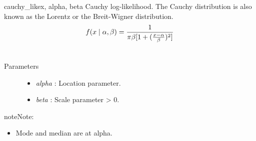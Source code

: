 \hypertarget{pymc.distributions.cauchy_like}{}\begin{funcdesc}{cauchy\_like}{x, alpha, beta}
Cauchy log-likelihood. The Cauchy distribution is also known as the
Lorentz or the Breit-Wigner distribution.
\begin{gather}
\begin{split}f(x \mid \alpha, \beta) = \frac{1}{\pi \beta [1 + (\frac{x-\alpha}{\beta})^2]}\end{split}\notag\\\begin{split}\end{split}\notag
\end{gather}\begin{description}
\item[Parameters] \leavevmode\begin{itemize}
\item {} 
\emph{alpha} : Location parameter.

\item {} 
\emph{beta} : Scale parameter \textgreater{} 0.

\end{itemize}

\end{description}

\begin{notice}{note}{Note:}\begin{itemize}
\item {} 
Mode and median are at alpha.

\end{itemize}
\end{notice}
\end{funcdesc}

